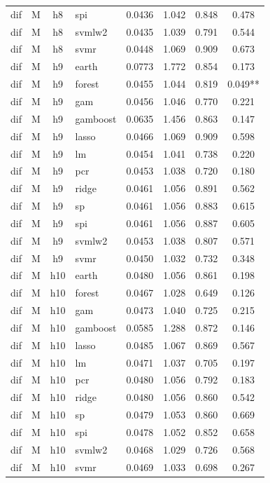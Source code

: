 \begin{ThreePartTable}
\begin{longtable}[t]{llclcccc}
dif & M & h8 & spi & 0.0436 & 1.042 & 0.848 & 0.478\\
dif & M & h8 & svmlw2 & 0.0435 & 1.039 & 0.791 & 0.544\\
dif & M & h8 & svmr & 0.0448 & 1.069 & 0.909 & 0.673\\
\addlinespace
dif & M & h9 & earth & 0.0773 & 1.772 & 0.854 & 0.173\\
dif & M & h9 & forest & 0.0455 & 1.044 & 0.819 & 0.049**\\
dif & M & h9 & gam & 0.0456 & 1.046 & 0.770 & 0.221\\
dif & M & h9 & gamboost & 0.0635 & 1.456 & 0.863 & 0.147\\
dif & M & h9 & lasso & 0.0466 & 1.069 & 0.909 & 0.598\\
dif & M & h9 & lm & 0.0454 & 1.041 & 0.738 & 0.220\\
dif & M & h9 & pcr & 0.0453 & 1.038 & 0.720 & 0.180\\
dif & M & h9 & ridge & 0.0461 & 1.056 & 0.891 & 0.562\\
dif & M & h9 & sp & 0.0461 & 1.056 & 0.883 & 0.615\\
dif & M & h9 & spi & 0.0461 & 1.056 & 0.887 & 0.605\\
dif & M & h9 & svmlw2 & 0.0453 & 1.038 & 0.807 & 0.571\\
dif & M & h9 & svmr & 0.0450 & 1.032 & 0.732 & 0.348\\
\addlinespace
dif & M & h10 & earth & 0.0480 & 1.056 & 0.861 & 0.198\\
dif & M & h10 & forest & 0.0467 & 1.028 & 0.649 & 0.126\\
dif & M & h10 & gam & 0.0473 & 1.040 & 0.725 & 0.215\\
dif & M & h10 & gamboost & 0.0585 & 1.288 & 0.872 & 0.146\\
dif & M & h10 & lasso & 0.0485 & 1.067 & 0.869 & 0.567\\
dif & M & h10 & lm & 0.0471 & 1.037 & 0.705 & 0.197\\
dif & M & h10 & pcr & 0.0480 & 1.056 & 0.792 & 0.183\\
dif & M & h10 & ridge & 0.0480 & 1.056 & 0.860 & 0.542\\
dif & M & h10 & sp & 0.0479 & 1.053 & 0.860 & 0.669\\
dif & M & h10 & spi & 0.0478 & 1.052 & 0.852 & 0.658\\
dif & M & h10 & svmlw2 & 0.0468 & 1.029 & 0.726 & 0.568\\
dif & M & h10 & svmr & 0.0469 & 1.033 & 0.698 & 0.267\\

\end{longtable}
\end{ThreePartTable}

